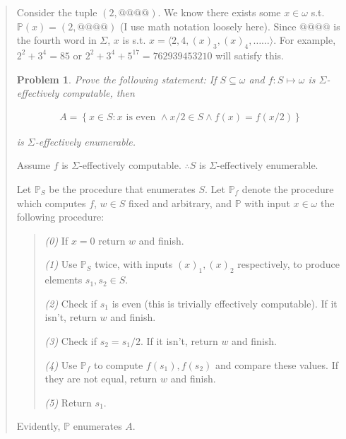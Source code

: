 \documentclass[a4paper, 12pt]{article}
\newtheorem{problem}{Problem}
\newtheorem{problem}{Problem}
\begin{document}
\begin{quote}
Consider the tuple $(2, @@@@)$. We know there exists some $x \in \omega$ s.t.
$\mathbb{P}(x) = (2, @@@@)$ (I use math notation loosely here). Since $@@@@$ is
the fourth word in $\Sigma$, $x$ is s.t.
 $x = \langle 2, 4, (x)_3, (x)_4, \ldots \ldots\rangle $. For example, $2^2 + 3^4 =
85$ or $2^2 + 3^4 + 5^{17} = 762939453210$ will satisfy this.


\begin{problem}
    Prove the following statement: If $S \subseteq \omega$ and $f : S \mapsto
    \omega$ is $\Sigma$-effectively computable, then 
    
    \begin{align*}
        A = \left\{ x \in  S : x \text{ is even } \land x / 2 \in S \land f(x) = f(x
        / 2) \right\} 
    \end{align*}

    is $\Sigma$-effectively enumerable.
\end{problem}

Assume $f$ is $\Sigma$-effectively computable.  $\therefore S$ is
$\Sigma$-effectively enumerable. 

Let $\mathbb{P}_S$ be the procedure that enumerates $S$. Let $\mathbb{P}_f$
denote the procedure which computes $f$, $w \in S$ fixed and arbitrary, and $\mathbb{P}$ with input $x \in
\omega$ the following
procedure: 

\begin{quote}

    \textit{(0)} If $x = 0$ return $w$ and finish. 

    \textit{(1)} Use $\mathbb{P}_S$ twice, with inputs $(x)_1, (x)_2$
    respectively, to produce elements $s_1, s_2 \in S$. 

    \textit{(2)} Check if $s_1$ is even (this is trivially effectively
    computable). If it isn't, return $w$ and finish. 

    \textit{(3)} Check if $s_2 = s_1 / 2 $. If it isn't, return $w$ and finish.

    \textit{(4)} Use $\mathbb{P}_f$ to compute $f(s_1), f(s_2)$ and compare
    these values. If they are not equal, return $w$ and finish. 

    \textit{(5)} Return $s_1$.
\end{quote}

Evidently, $\mathbb{P}$ enumerates $A$.


\end{quote}
\normalsize



\pagebreak
\end{document}
